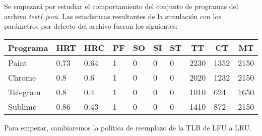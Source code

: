 \documentclass{article}
\begin{document}
Se empezará por estudiar el comportamiento del conjunto de programas del archivo \textit{test1.json}. Las estadisticas resultantes de la simulación con los parámetros por defecto del archivo fueron los siguientes:
\begin{table}[H]
\begin{tabular}{|l|l|l|l|l|l|l|l|l|l|}
\hline
\multicolumn{1}{|c|}{\textbf{Programa}} & \multicolumn{1}{c|}{\textbf{HRT}} & \multicolumn{1}{c|}{\textbf{HRC}} & \multicolumn{1}{c|}{\textbf{PF}} & \multicolumn{1}{c|}{\textbf{SO}} & \multicolumn{1}{c|}{\textbf{SI}} & \multicolumn{1}{c|}{\textbf{ST}} & \multicolumn{1}{c|}{\textbf{TT}} & \multicolumn{1}{c|}{\textbf{CT}} & \multicolumn{1}{c|}{\textbf{MT}} \\ \hline
Paint                                   & 0.73                              & 0.64                              & 1                                & 0                                & 0                                & 0                                & 2230                             & 1352                             & 2150                             \\ \hline
Chrome                                  & 0.8                               & 0.6                               & 1                                & 0                                & 0                                & 0                                & 2020                             & 1232                             & 2150                             \\ \hline
Telegram                                & 0.8                               & 0.4                               & 1                                & 0                                & 0                                & 0                                & 1010                             & 624                              & 1650                             \\ \hline
Sublime                                 & 0.86                              & 0.43                              & 1                                & 0                                & 0                                & 0                                & 1410                             & 872                              & 2150                             \\ \hline
\end{tabular}
\end{table}

Para empezar,  cambiaremos  la política de reemplazo de la TLB de LFU a LRU.
\end{document}
